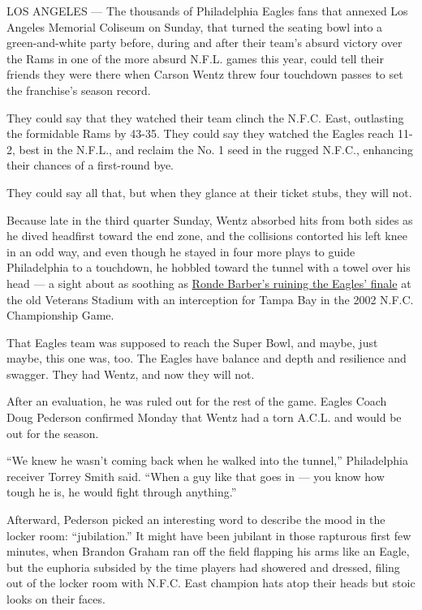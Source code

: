 LOS ANGELES --- The thousands of Philadelphia Eagles fans that annexed
Los Angeles Memorial Coliseum on Sunday, that turned the seating bowl
into a green-and-white party before, during and after their team's
absurd victory over the Rams in one of the more absurd N.F.L. games this
year, could tell their friends they were there when Carson Wentz threw
four touchdown passes to set the franchise's season record.

They could say that they watched their team clinch the N.F.C. East,
outlasting the formidable Rams by 43-35. They could say they watched the
Eagles reach 11-2, best in the N.F.L., and reclaim the No. 1 seed in the
rugged N.F.C., enhancing their chances of a first-round bye.

They could say all that, but when they glance at their ticket stubs,
they will not.

Because late in the third quarter Sunday, Wentz absorbed hits from both
sides as he dived headfirst toward the end zone, and the collisions
contorted his left knee in an odd way, and even though he stayed in four
more plays to guide Philadelphia to a touchdown, he hobbled toward the
tunnel with a towel over his head --- a sight about as soothing as
\href{https://www.youtube.com/watch?v=iCHvKUzTK4k}{Ronde Barber's
ruining the Eagles' finale} at the old Veterans Stadium with an
interception for Tampa Bay in the 2002 N.F.C. Championship Game.

That Eagles team was supposed to reach the Super Bowl, and maybe, just
maybe, this one was, too. The Eagles have balance and depth and
resilience and swagger. They had Wentz, and now they will not.

After an evaluation, he was ruled out for the rest of the game. Eagles
Coach Doug Pederson confirmed Monday that Wentz had a torn A.C.L. and
would be out for the season.

``We knew he wasn't coming back when he walked into the tunnel,''
Philadelphia receiver Torrey Smith said. ``When a guy like that goes in
--- you know how tough he is, he would fight through anything.''

Afterward, Pederson picked an interesting word to describe the mood in
the locker room: ``jubilation.'' It might have been jubilant in those
rapturous first few minutes, when Brandon Graham ran off the field
flapping his arms like an Eagle, but the euphoria subsided by the time
players had showered and dressed, filing out of the locker room with
N.F.C. East champion hats atop their heads but stoic looks on their
faces.

